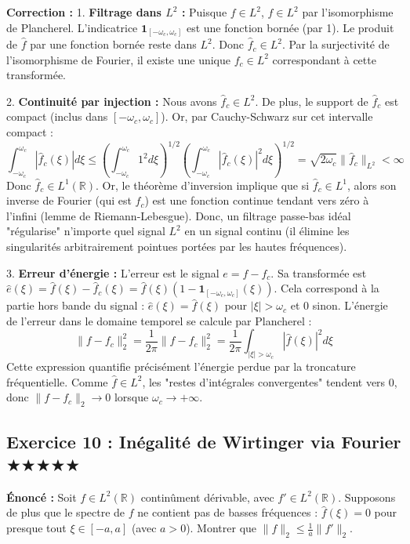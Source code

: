 \documentclass[11pt,a4paper]{article}
\begin{document}
\textbf{Correction :}
1. \textbf{Filtrage dans $L^2$ :}
Puisque $f \in L^2$, $\hat{f} \in L^2$ par l'isomorphisme de Plancherel.
L'indicatrice $\mathbf{1}_{[-\omega_c, \omega_c]}$ est une fonction bornée (par 1).
Le produit de $\hat{f}$ par une fonction bornée reste dans $L^2$. Donc $\hat{f}_c \in L^2$.
Par la surjectivité de l'isomorphisme de Fourier, il existe une unique $f_c \in L^2$ correspondant à cette transformée.

2. \textbf{Continuité par injection :}
Nous avons $\hat{f}_c \in L^2$. De plus, le support de $\hat{f}_c$ est compact (inclus dans $[-\omega_c, \omega_c]$).
Or, par Cauchy-Schwarz sur cet intervalle compact :
$$ \int_{-\omega_c}^{\omega_c} |\hat{f}_c(\xi)| d\xi \le \left( \int_{-\omega_c}^{\omega_c} 1^2 d\xi \right)^{1/2} \left( \int_{-\omega_c}^{\omega_c} |\hat{f}_c(\xi)|^2 d\xi \right)^{1/2} = \sqrt{2\omega_c} \|\hat{f}_c\|_{L^2} < \infty $$
Donc $\hat{f}_c \in L^1(\mathbb{R})$.
Or, le théorème d'inversion implique que si $\hat{f}_c \in L^1$, alors son inverse de Fourier (qui est $f_c$) est une fonction continue tendant vers zéro à l'infini (lemme de Riemann-Lebesgue).
Donc, un filtrage passe-bas idéal "régularise" n'importe quel signal $L^2$ en un signal continu (il élimine les singularités arbitrairement pointues portées par les hautes fréquences).

3. \textbf{Erreur d'énergie :}
L'erreur est le signal $e = f - f_c$.
Sa transformée est $\hat{e}(\xi) = \hat{f}(\xi) - \hat{f}_c(\xi) = \hat{f}(\xi)(1 - \mathbf{1}_{[-\omega_c, \omega_c]}(\xi))$.
Cela correspond à la partie hors bande du signal : $\hat{e}(\xi) = \hat{f}(\xi)$ pour $|\xi| > \omega_c$ et $0$ sinon.
L'énergie de l'erreur dans le domaine temporel se calcule par Plancherel :
$$ \|f - f_c\|_2^2 = \frac{1}{2\pi} \|\hat{f} - \hat{f}_c\|_2^2 = \frac{1}{2\pi} \int_{|\xi| > \omega_c} |\hat{f}(\xi)|^2 d\xi $$
Cette expression quantifie précisément l'énergie perdue par la troncature fréquentielle. Comme $\hat{f} \in L^2$, les "restes d'intégrales convergentes" tendent vers 0, donc $\|f - f_c\|_2 \to 0$ lorsque $\omega_c \to +\infty$.



\subsection*{Exercice 10 : Inégalité de Wirtinger via Fourier \quad $\bigstar\bigstar\bigstar\bigstar\bigstar$}

\textbf{Énoncé :}
Soit $f \in L^2(\mathbb{R})$ continûment dérivable, avec $f' \in L^2(\mathbb{R})$.
Supposons de plus que le spectre de $f$ ne contient pas de basses fréquences : $\hat{f}(\xi) = 0$ pour presque tout $\xi \in [-a, a]$ (avec $a > 0$).
Montrer que $\|f\|_2 \le \frac{1}{a} \|f'\|_2$.
\end{document}
